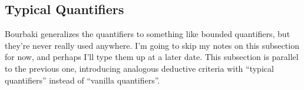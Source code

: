 \subsection{Typical Quantifiers}
Bourbaki generalizes the quantifiers to something like bounded
quantifiers, but they're never really used anywhere. I'm going to skip
my notes on this subsection for now, and perhaps I'll type them up at a
later date. This subsection is parallel to the previous one, introducing
analogous deductive criteria with ``typical quantifiers'' instead of
``vanilla quantifiers''.

\setcounter{dc}{42}

